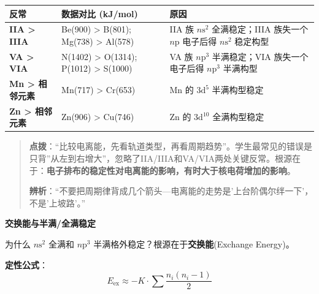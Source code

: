 {\def\LTcaptype{none} %
\begin{longtable}[]{@{}
  >{\raggedright\arraybackslash}p{}
  >{\raggedright\arraybackslash}p{}
  >{\raggedright\arraybackslash}p{}@{}}
\toprule\noalign{}
\begin{minipage}[b]{\linewidth}\raggedright
反常
\end{minipage} & \begin{minipage}[b]{\linewidth}\raggedright
数据对比 (kJ/mol)
\end{minipage} & \begin{minipage}[b]{\linewidth}\raggedright
原因
\end{minipage} \\
\midrule\noalign{}
\endhead
\bottomrule\noalign{}
\endlastfoot
\textbf{IIA \textgreater{} IIIA} & Be(900) \textgreater{} B(801); Mg(738) \textgreater{} Al(578) & IIA 族 \(n\mathrm{s}^2\) 全满稳定；IIIA 族失一个 \(n\mathrm{p}\) 电子后得 \(n\mathrm{s}^2\) 稳定构型 \\
\textbf{VA \textgreater{} VIA} & N(1402) \textgreater{} O(1314); P(1012) \textgreater{} S(1000) & VA 族 \(n\mathrm{p}^3\) 半满稳定；VIA 族失一个电子后得 \(n\mathrm{p}^3\) 半满构型 \\
\textbf{Mn \textgreater{} 相邻元素} & Mn(717) \textgreater{} Cr(653) & Mn 的 \(3\mathrm{d}^5\) 半满构型稳定 \\
\textbf{Zn \textgreater{} 相邻元素} & Zn(906) \textgreater{} Cu(746) & Zn 的 \(3\mathrm{d}^{10}\) 全满构型稳定 \\
\end{longtable}
}

\begin{quote}
\textbf{点拨}：``比较电离能，先看轨道类型，再看周期趋势''。学生最常见的错误是只背''从左到右增大''，忽略了IIA/IIIA和VA/VIA两处关键反常。根源在于：\textbf{电子排布的稳定性对电离能的影响，有时大于核电荷增加的影响}。

\textbf{辨析}：``不要把周期律背成几个箭头---电离能的走势是'上台阶偶尔绊一下'，不是'上坡路'。''
\end{quote}

\textbf{交换能与半满/全满稳定}

为什么 \(n\mathrm{s}^2\) 全满和 \(n\mathrm{p}^3\) 半满格外稳定？根源在于\textbf{交换能}(Exchange Energy)。

\textbf{定性公式}：
\[E_{\text{ex}} \approx -K \cdot \sum \frac{n_i(n_i-1)}{2}\]


